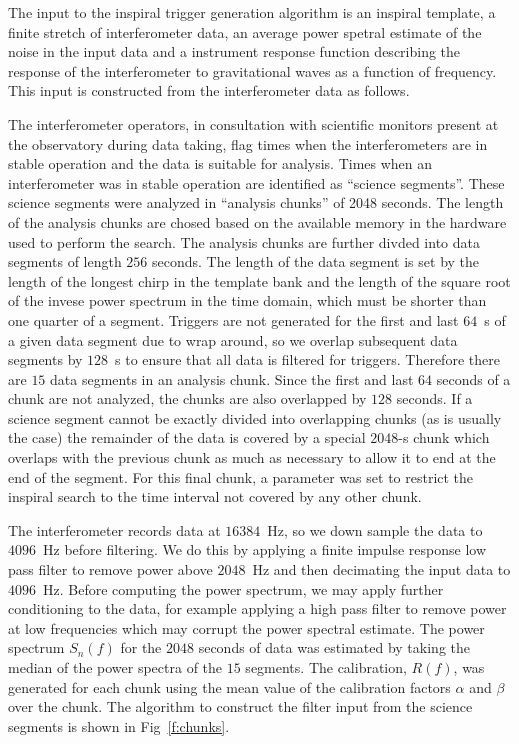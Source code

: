 The input to the inspiral trigger generation algorithm is an inspiral
template, a finite stretch of interferometer data, an average power spetral
estimate of the noise in the input data and a instrument response function
describing the response of the interferometer to gravitational waves as a
function of frequency. This input is constructed from the interferometer data
as follows.  

The interferometer operators, in consultation with scientific monitors present
at the observatory during data taking, flag times when the interferometers are
in stable operation and the data is suitable for analysis.  Times when an
interferometer was in stable operation are identified as ``science segments''.
These science segments were analyzed in ``analysis chunks'' of 2048 seconds.
The length of the analysis chunks are chosed based on the available memory in
the hardware used to perform the search.  The analysis chunks are further
divded into data segments of length $256$ seconds. The length of the data
segment is set by the length of the longest chirp in the template bank and the
length of the square root of the invese power spectrum in the time domain,
which must be shorter than one quarter of a segment.  Triggers are not
generated for the first and last $64$~s of a given data segment due to wrap
around, so we overlap subsequent data segments by $128$~s to ensure that all
data is filtered for triggers. Therefore there are $15$ data segments in an
analysis chunk. Since the first and last $64$ seconds of a chunk are not
analyzed, the chunks are also overlapped by $128$ seconds.  If a science
segment cannot be exactly divided into overlapping chunks (as is usually the
case) the remainder of the data is covered by a special $2048$-s chunk which
overlaps with the previous chunk as much as necessary to allow it to end at
the end of the segment.  For this final chunk, a parameter was set to restrict
the inspiral search to the time interval not covered by any other chunk. 

The interferometer records data at $16384$~Hz, so we down sample the data to
$4096$~Hz before filtering. We do this by applying a finite impulse response
low pass filter to remove power above $2048$~Hz and then decimating the input
data to $4096$~Hz. Before computing the power spectrum, we may apply further
conditioning to the data, for example applying a high pass filter to remove
power at low frequencies which may corrupt the power spectral estimate.  The
power spectrum $S_n(f)$ for the $2048$ seconds of data was estimated by taking
the median of the power spectra of the $15$ segments.  The calibration,
$R(f)$, was generated for each chunk using the mean value of the calibration
factors $\alpha$ and $\beta$ over the chunk.  The algorithm to construct the
filter input from the science segments is shown in Fig~\ref{f:chunks}.

